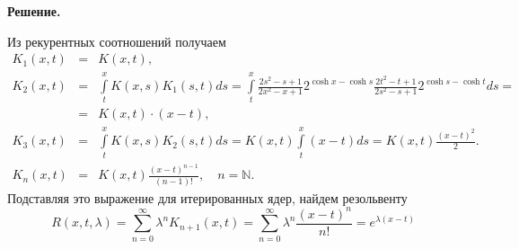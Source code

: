 \noindent
{\bf Решение.~}\\
\noindent

Из рекурентных соотношений получаем
$$
\begin{array}{rcl}
K_1(x,t)&=&\displaystyle K(x,t), \\[12pt]
K_2(x,t)&=&\displaystyle\int\limits_t^x K(x,s)K_1(s,t)ds = \int\limits_t^x \frac{2s^2 - s+1}{2x^2-x+1} 2^{\cosh x - \cosh s} \frac{2t^2 - t+1}{2s^2-s+1} 2^{\cosh s - \cosh t} ds =\\ 
&=& K(x,t)\cdot \left( x-t \right),  \\[12pt]
K_3(x,t)&=&\displaystyle\int\limits_t^x K(x,s)K_2(s,t)ds = K(x,t) \int\limits_t^x \left( x-t \right) ds = K(x,t) \frac{\left( x-t \right)^2}{2}.\\[12pt]
K_n(x,t)&=&\displaystyle K(x,t)\frac{\left(x-t\right)^{n-1}}{(n-1)!},\quad n=\mathbb{N}.
\end{array}
$$
Подставляя это выражение для итерированных ядер, найдем резольвенту
$$ 
R(x,t,\lambda)=\sum_{n=0}^\infty \lambda^n K_{n+1}(x,t) =\sum_{n=0}^\infty \lambda^n \frac{\left(x-t\right)^{n}}{n!} = e^{\lambda(x-t)}

$$